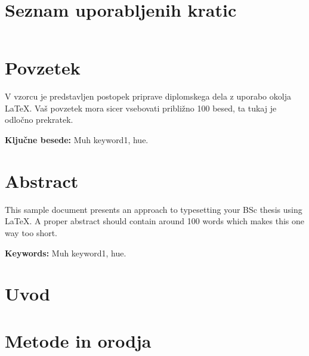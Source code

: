 \documentclass[a4paper, 12pt]{book}
\newcommand{\tkeywords}{Muh keyword1, hue}
\newcommand{\tkeywordsEn}{Muh keyword1, hue}
\newcommand{\clearemptydoublepage}{\newpage{\pagestyle{empty}\cleardoublepage}}
\begin{document}
\clearemptydoublepage


\chapter*{Seznam uporabljenih kratic}

\begin{tabular}{l|l|l}
\end{tabular}



\clearemptydoublepage

\chapter*{Povzetek}
V vzorcu je predstavljen postopek priprave diplomskega dela z uporabo okolja \LaTeX. Vaš povzetek mora sicer vsebovati približno 100 besed, ta tukaj je odločno prekratek.
\bigskip

\noindent\textbf{Ključne besede: } \tkeywords.
\clearemptydoublepage

\chapter*{Abstract}
This sample document presents an approach to typesetting your BSc thesis using \LaTeX. A proper abstract should contain around 100 words which makes this one way too short.
\bigskip

\noindent\textbf{Keywords:} \tkeywordsEn.
\clearemptydoublepage

\mainmatter
\setcounter{page}{1}
\pagestyle{fancy}

\chapter{Uvod}
\chapter{Metode in orodja}
\end{document}
